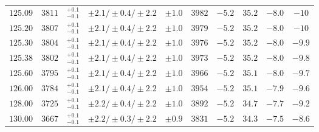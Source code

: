 \begin{table}[ht!]
\begin{center}
\begin{small}
\begin{tabular}{cccccccc|cc}
$125.09$ & $3811$ & $^{+0.1}_{-0.1}$ & $\pm 2.1/\pm 0.4/\pm 2.2$ & $\pm 1.0$ & $3982$ & $-5.2$ & $35.2 $ & $-8.0$ & $-10  $ \\
$125.20$ & $3807$ & $^{+0.1}_{-0.1}$ & $\pm 2.1/\pm 0.4/\pm 2.2$ & $\pm 1.0$ & $3979$ & $-5.2$ & $35.2 $ & $-8.0$ & $-10  $ \\
$125.30$ & $3804$ & $^{+0.1}_{-0.1}$ & $\pm 2.1/\pm 0.4/\pm 2.2$ & $\pm 1.0$ & $3976$ & $-5.2$ & $35.2 $ & $-8.0$ & $-9.9 $ \\
$125.38$ & $3802$ & $^{+0.1}_{-0.1}$ & $\pm 2.1/\pm 0.4/\pm 2.2$ & $\pm 1.0$ & $3973$ & $-5.2$ & $35.2 $ & $-8.0$ & $-9.8 $ \\
$125.60$ & $3795$ & $^{+0.1}_{-0.1}$ & $\pm 2.1/\pm 0.4/\pm 2.2$ & $\pm 1.0$ & $3966$ & $-5.2$ & $35.1 $ & $-8.0$ & $-9.7 $ \\
$126.00$ & $3784$ & $^{+0.1}_{-0.1}$ & $\pm 2.1/\pm 0.4/\pm 2.2$ & $\pm 1.0$ & $3954$ & $-5.2$ & $35.1 $ & $-7.9$ & $-9.6 $ \\
$128.00$ & $3725$ & $^{+0.1}_{-0.1}$ & $\pm 2.2/\pm 0.4/\pm 2.2$ & $\pm 1.0$ & $3892$ & $-5.2$ & $34.7 $ & $-7.7$ & $-9.2 $ \\
$130.00$ & $3667$ & $^{+0.1}_{-0.1}$ & $\pm 2.2/\pm 0.3/\pm 2.2$ & $\pm 0.9$ & $3831$ & $-5.2$ & $34.3 $ & $-7.5$ & $-8.6 $ \\
\bottomrule
\end{tabular}%
\end{small}%
\end{center}%
\end{table}

